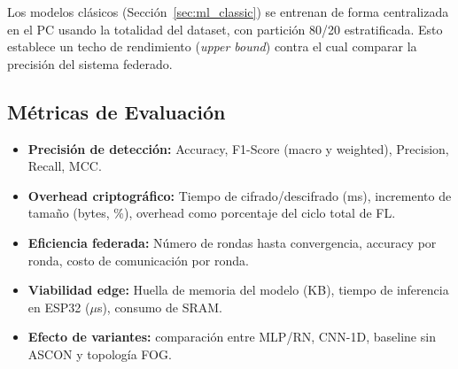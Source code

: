Los modelos clásicos (Sección~\ref{sec:ml_classic}) se entrenan de forma centralizada en el PC usando la totalidad del dataset, con partición 80/20 estratificada. Esto establece un techo de rendimiento (\emph{upper bound}) contra el cual comparar la precisión del sistema federado.

\subsection{Métricas de Evaluación}

\begin{itemize}
    \item \textbf{Precisión de detección:} Accuracy, F1-Score (macro y weighted), Precision, Recall, MCC.
    \item \textbf{Overhead criptográfico:} Tiempo de cifrado/descifrado (ms), incremento de tamaño (bytes, \%), overhead como porcentaje del ciclo total de FL.
    \item \textbf{Eficiencia federada:} Número de rondas hasta convergencia, accuracy por ronda, costo de comunicación por ronda.
    \item \textbf{Viabilidad edge:} Huella de memoria del modelo (KB), tiempo de inferencia en ESP32 ($\mu$s), consumo de SRAM.
    \item \textbf{Efecto de variantes:} comparación entre MLP/RN, CNN-1D, baseline sin ASCON y topología FOG.
\end{itemize}
